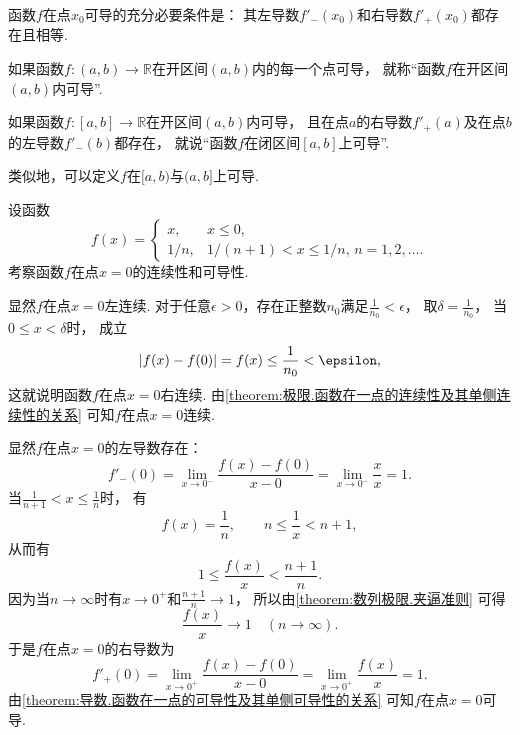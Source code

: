 \begin{theorem}[导数存在的充分必要条件]\label{theorem:导数.函数在一点的可导性及其单侧可导性的关系}
函数\(f\)在点\(x_0\)可导的充分必要条件是：
其左导数\(f'_-(x_0)\)和右导数\(f'_+(x_0)\)都存在且相等.
\end{theorem}

\begin{definition}
如果函数\(f\colon(a,b)\to\mathbb{R}\)在开区间\((a,b)\)内的每一个点可导，
就称“函数\(f\)在开区间\((a,b)\)内可导”.
\end{definition}

\begin{definition}
如果函数\(f\colon[a,b]\to\mathbb{R}\)在开区间\((a,b)\)内可导，
且在点\(a\)的右导数\(f'_+(a)\)及在点\(b\)的左导数\(f'_-(b)\)都存在，
就说“函数\(f\)在闭区间\([a,b]\)上可导”.
\end{definition}

类似地，可以定义\(f\)在\([a,b)\)与\((a,b]\)上可导.

\begin{example}
设函数\[
	f(x) = \left\{ \begin{array}{cl}
		x, & x\leq0, \\
		1/n, & 1/(n+1)<x\leq1/n,\,n=1,2,\dotsc.
	\end{array} \right.
\]
考察函数\(f\)在点\(x=0\)的连续性和可导性.
\begin{solution}
显然\(f\)在点\(x=0\)左连续.
对于任意\(\epsilon>0\)，存在正整数\(n_0\)满足\(\frac1{n_0}<\epsilon\)，
取\(\delta=\frac1{n_0}\)，
当\(0 \leq x < \delta\)时，
成立\[
	\abs{f(x) - f(0)}
	= f(x)
	\leq \frac1{n_0}
	< \epsilon,
\]
这就说明函数\(f\)在点\(x=0\)右连续.
由\cref{theorem:极限.函数在一点的连续性及其单侧连续性的关系} 可知\(f\)在点\(x=0\)连续.

显然\(f\)在点\(x=0\)的左导数存在：\[
	f'_-(0) = \lim_{x\to0^-} \frac{f(x) - f(0)}{x - 0}
	= \lim_{x\to0^-} \frac{x}{x}
	= 1.
\]
当\(\frac1{n+1} < x \leq \frac1n\)时，
有\[
	f(x) = \frac1n,
	\qquad
	n \leq \frac1x < n+1,
\]
从而有\[
	1 \leq \frac{f(x)}{x} < \frac{n+1}{n}.
\]
因为当\(n\to\infty\)时有\(x\to0^+\)和\(\frac{n+1}{n}\to1\)，
所以由\cref{theorem:数列极限.夹逼准则} 可得\[
	\frac{f(x)}{x} \to 1
	\quad(n\to\infty).
\]
于是\(f\)在点\(x=0\)的右导数为\[
	f'_+(0) = \lim_{x\to0^+} \frac{f(x) - f(0)}{x - 0}
	= \lim_{x\to0^+} \frac{f(x)}{x}
	= 1.
\]
由\cref{theorem:导数.函数在一点的可导性及其单侧可导性的关系} 可知\(f\)在点\(x=0\)可导.
\end{solution}
\end{example}

